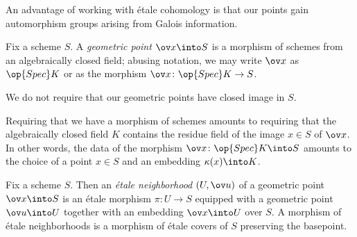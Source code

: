 \documentclass[../notes.tex]{subfiles}
\begin{document}
An advantage of working with \'etale cohomology is that our points gain automorphism groups arising from Galois information.
\begin{definition}
	Fix a scheme $S$. A \textit{geometric point} $\ov x\into S$ is a morphism of schemes from an algebraically closed field; abusing notation, we may write $\ov x$ as $\op{Spec}K$ or as the morphism $\ov x\colon\op{Spec}K\to S$.
\end{definition}
\begin{remark}
	We do not require that our geometric points have closed image in $S$.
\end{remark}
\begin{remark}
	Requiring that we have a morphism of schemes amounts to requiring that the algebraic\-ally closed field $K$ contains the residue field of the image $x\in S$ of $\ov x$. In other words, the data of the morphism $\ov x\colon\op{Spec}K\into S$ amounts to the choice of a point $x\in S$ and an embedding $\kappa(x)\into K$.
\end{remark}
\begin{defihelper} 
	Fix a scheme $S$. Then an \textit{\'etale neighborhood} $(U,\ov u)$ of a geometric point $\ov x\into S$ is an \'etale morphism $\pi\colon U\to S$ equipped with a geometric point $\ov u\into U$ together with an embedding $\ov x\into U$ over $S$. A morphism of \'etale neighborhoods is a morphism of \'etale covers of $S$ preserving the basepoint.
\end{defihelper}
\end{document}
